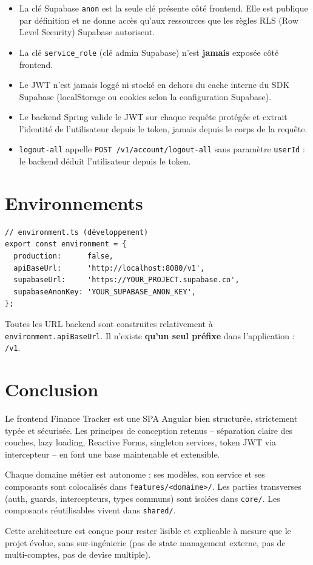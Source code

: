 \documentclass[12pt,a4paper]{article}
\begin{document}
\begin{itemize}
  \item La clé Supabase \texttt{anon} est la seule clé présente côté frontend.
        Elle est publique par définition et ne donne accès qu'aux ressources
        que les règles RLS (Row Level Security) Supabase autorisent.
  \item La clé \texttt{service\_role} (clé admin Supabase) n'est \textbf{jamais} exposée
        côté frontend.
  \item Le JWT n'est jamais loggé ni stocké en dehors du cache interne du SDK Supabase
        (localStorage ou cookies selon la configuration Supabase).
  \item Le backend Spring valide le JWT sur chaque requête protégée et extrait
        l'identité de l'utilisateur depuis le token, jamais depuis le corps de la requête.
  \item \texttt{logout-all} appelle \texttt{POST /v1/account/logout-all} sans
        paramètre \texttt{userId} : le backend déduit l'utilisateur depuis le token.
\end{itemize}

\section{Environnements}

\begin{lstlisting}
// environment.ts (développement)
export const environment = {
  production:      false,
  apiBaseUrl:      'http://localhost:8080/v1',
  supabaseUrl:     'https://YOUR_PROJECT.supabase.co',
  supabaseAnonKey: 'YOUR_SUPABASE_ANON_KEY',
};
\end{lstlisting}

Toutes les URL backend sont construites relativement à \texttt{environment.apiBaseUrl}.
Il n'existe \textbf{qu'un seul préfixe} dans l'application : \texttt{/v1}.

\section{Conclusion}

Le frontend Finance Tracker est une SPA Angular bien structurée, strictement typée
et sécurisée. Les principes de conception retenus -- séparation claire des couches,
lazy loading, Reactive Forms, singleton services, token JWT via intercepteur --
en font une base maintenable et extensible.

Chaque domaine métier est autonome : ses modèles, son service et ses composants
sont colocalisés dans \texttt{features/<domaine>/}. Les parties transverses
(auth, guards, intercepteurs, types communs) sont isolées dans \texttt{core/}.
Les composants réutilisables vivent dans \texttt{shared/}.

Cette architecture est conçue pour rester lisible et explicable à mesure que
le projet évolue, sans sur-ingénierie (pas de state management externe, pas de
multi-comptes, pas de devise multiple).
\end{document}
